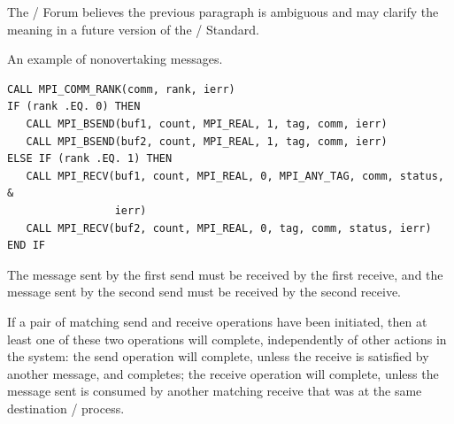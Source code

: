 \begin{implementors}
The \MPI/ Forum believes the previous paragraph is ambiguous and may clarify the meaning in a future version of the \MPI/ Standard.
\end{implementors}

\begin{example}
\label{pt2pt-exE}
%
%
An example of nonovertaking messages.

\begin{lstlisting}[language={[MPI]Fortran}]
CALL MPI_COMM_RANK(comm, rank, ierr)
IF (rank .EQ. 0) THEN
   CALL MPI_BSEND(buf1, count, MPI_REAL, 1, tag, comm, ierr)
   CALL MPI_BSEND(buf2, count, MPI_REAL, 1, tag, comm, ierr)
ELSE IF (rank .EQ. 1) THEN
   CALL MPI_RECV(buf1, count, MPI_REAL, 0, MPI_ANY_TAG, comm, status, &
                 ierr)
   CALL MPI_RECV(buf2, count, MPI_REAL, 0, tag, comm, status, ierr)
END IF
\end{lstlisting}
The message sent by the first send must be received by the first receive, and
the message sent by the second send must be received by the second receive.
\end{example}


If a pair of
matching send and receive operations have been initiated, then at
least one of these two operations will complete, independently of
other actions in the system: the send operation will
complete, unless the receive is satisfied by another message, and
completes; the
receive operation will complete, unless the message sent is consumed by another
matching receive that was  at the same destination \MPI/ process.

